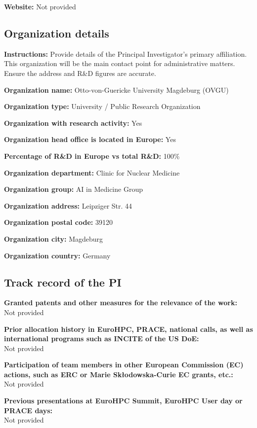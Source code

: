 \documentclass[12pt,a4paper]{article}
\begin{document}
\textbf{Website:} Not provided

\subsection*{Organization details}

\textbf{Instructions:} Provide details of the Principal Investigator's primary affiliation. This organization will be the main contact point for administrative matters. Ensure the address and R\&D figures are accurate.

\textbf{Organization name:} Otto-von-Guericke University Magdeburg (OVGU)

\textbf{Organization type:} University / Public Research Organization

\textbf{Organization with research activity:} Yes

\textbf{Organization head office is located in Europe:} Yes

\textbf{Percentage of R\&D in Europe vs total R\&D:} 100\%

\textbf{Organization department:} Clinic for Nuclear Medicine

\textbf{Organization group:} AI in Medicine Group

\textbf{Organization address:} Leipziger Str. 44

\textbf{Organization postal code:} 39120

\textbf{Organization city:} Magdeburg

\textbf{Organization country:} Germany

\subsection*{Track record of the PI}

\textbf{Granted patents and other measures for the relevance of the work:} \\
Not provided

\textbf{Prior allocation history in EuroHPC, PRACE, national calls, as well as international programs such as INCITE of the US DoE:} \\
Not provided

\textbf{Participation of team members in other European Commission (EC) actions, such as ERC or Marie Skłodowska-Curie EC grants, etc.:} \\
Not provided

\textbf{Previous presentations at EuroHPC Summit, EuroHPC User day or PRACE days:} \\
Not provided
\end{document}
